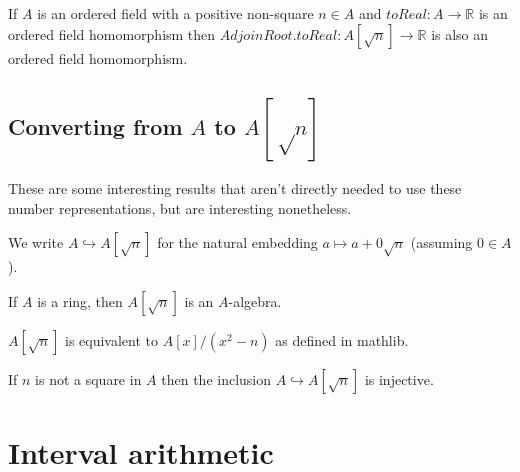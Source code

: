 \begin{lemma}
  \label{thm:adjoinToRealOrderedFieldHom}
  If $A$ is an ordered field with a positive non-square $n ∈ A$ and $toReal : A
  → ℝ$ is an ordered field homomorphism then $AdjoinRoot.toReal : A[\sqrt{n}] →
  ℝ$ is also an ordered field homomorphism.
\end{lemma}

\subsection{Converting from $A$ to $A[√n]$}

These are some interesting results that aren't directly needed to use these
number representations, but are interesting nonetheless.


\begin{definition}
  \label{def:adjoinEmbedding}
  \leanok
  We write $A \hookrightarrow A[\sqrt{n}]$ for the natural embedding
  $a \mapsto a + 0\sqrt{n}$ (assuming $0 ∈ A$).
\end{definition}


\begin{lemma}
  \label{thm:adjoinAlgebra}
  \leanok
  If $A$ is a ring, then $A[\sqrt{n}]$ is an $A$-algebra.
\end{lemma}

\begin{lemma}
  \label{thm:mathlibAdjoin}
  $A[\sqrt{n}]$ is equivalent to $A[x] / (x^2 - n)$ as defined in mathlib.
\end{lemma}


\begin{lemma}
  \label{thm:adjoinInjective}
  If $n$ is not a square in $A$ then the inclusion $A \hookrightarrow
  A[\sqrt{n}]$ is injective.
\end{lemma}

\section{Interval arithmetic}

